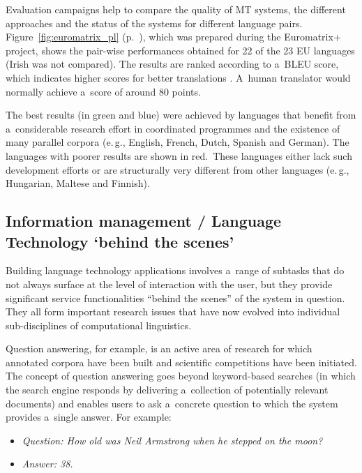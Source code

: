 \begin{multicols}{2}
Evaluation campaigns help to compare the quality of MT systems, the
different approaches and the status of the systems for different
language pairs. Figure~\ref{fig:euromatrix_pl} (p.~\pageref{fig:euromatrix_pl}), which was prepared during the Euromatrix+ project,
shows the pair-wise performances obtained for 22 of the 23 EU
languages (Irish was not compared). The results are ranked according
to a~BLEU score, which indicates higher scores for better translations
\cite{bleu1}. A~human translator would normally achieve a~score of
around 80 points. 

The best results (in green and blue) were achieved by languages that
benefit from a~considerable research effort in coordinated programmes
and the existence of many parallel corpora (e.\,g., English, French,
Dutch, Spanish and German). The languages with poorer results are
shown in red.~These languages either lack such development efforts or
are structurally very different from other languages (e.\,g.,
Hungarian, Maltese and Finnish). 
\vfill
\columnbreak

\subsection{Information management / Language Technology ‘behind the
scenes’} 

Building language technology applications involves a~range of subtasks
that do not always surface at the level of interaction with the user,
but they provide significant service functionalities “behind the
scenes” of the system in question. They all form important research
issues that have now evolved into individual sub-disciplines of
computational linguistics. 

Question answering, for example, is an active area of research for
which annotated corpora have been built and scientific competitions
have been initiated. The concept of question answering goes beyond
keyword-based searches (in which the search engine responds by
delivering a~collection of potentially relevant documents) and enables
users to ask a~concrete question to which the system provides a~single
answer. For example: 

\begin{itemize} 
  \item[] \textit{Question: How old was Neil Armstrong
when he stepped on the moon?} 
  \item[] \textit{Answer: 38.}
\end{itemize} 


\end{multicols}
